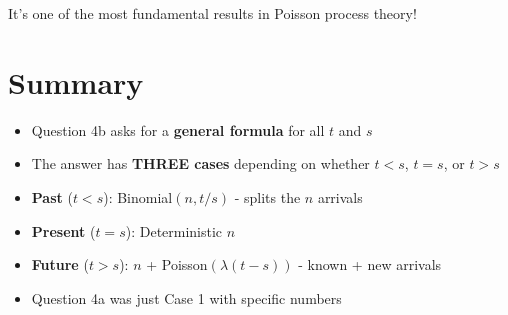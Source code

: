\documentclass[11pt]{article}
\begin{document}
It's one of the most fundamental results in Poisson process theory!

\section{Summary}

\begin{tcolorbox}[colback=blue!5!white,colframe=blue!75!black,title=Key Takeaways]
\begin{itemize}
    \item Question 4b asks for a \textbf{general formula} for all $t$ and $s$
    \item The answer has \textbf{THREE cases} depending on whether $t < s$, $t = s$, or $t > s$
    \item \textbf{Past} ($t < s$): Binomial$(n, t/s)$ - splits the $n$ arrivals
    \item \textbf{Present} ($t = s$): Deterministic $n$
    \item \textbf{Future} ($t > s$): $n$ + Poisson$(\lambda(t-s))$ - known + new arrivals
    \item Question 4a was just Case 1 with specific numbers
\end{itemize}
\end{tcolorbox}
\end{document}
